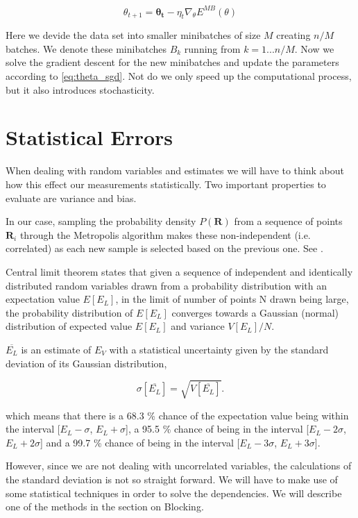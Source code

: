 \begin{equation} \label{eq:theta_sgd}
\theta_{t+1} = \mathbf{\theta_t} - \eta_t \nabla_{\theta} E^{MB} (\theta)
\end{equation}

Here we devide the data set into smaller minibatches of size $M$ creating $n/M$ batches. We denote these minibatches $B_k$ running from $k = 1...n/M$. Now we solve the gradient descent for the new minibatches and update the parameters according to \ref{eq:theta_sgd}. Not do we only speed up the computational process, but it also introduces stochasticity. 


\section{Statistical Errors}

When dealing with random variables and estimates we will have to think about how this effect our measurements statistically. Two important properties to evaluate are variance and bias. 

In our case, sampling the probability density $P(\mathbf{R})$ from a sequence of points $\mathbf{R}_i$ through the Metropolis algorithm makes these non-independent (i.e. correlated) as each new sample is selected based on the previous one. See .

Central limit theorem states that given a sequence of independent and identically distributed random variables drawn from a probability distribution with an expectation value $E[E_L]$, in the limit of number of points N drawn being large, the probability distribution of $E[E_L]$ converges towards a Gaussian (normal) distribution of expected value $E[E_L]$ and variance $V[E_L]/N$.

$\overline{E_L}$ is an estimate of $E_V$ with a statistical uncertainty given by the standard deviation of its Gaussian distribution, 

\begin{equation}
\sigma[\overline{E_L}] = \sqrt{V[\overline{E_L}]}.
\end{equation}

which means that there is a 68.3 \% chance of the expectation value being within the interval [$E_L - \sigma$, $E_L + \sigma$], a 95.5 \% chance of being in the interval [$E_L - 2\sigma$, $E_L + 2\sigma$] and a 99.7 \% chance of being in the interval [$E_L - 3\sigma$, $E_L + 3\sigma$].

However, since we are not dealing with uncorrelated variables, the calculations of the standard deviation is not so straight forward. We will have to make use of some statistical techniques in order to solve the dependencies. We will describe one of the methods in the section on Blocking.

